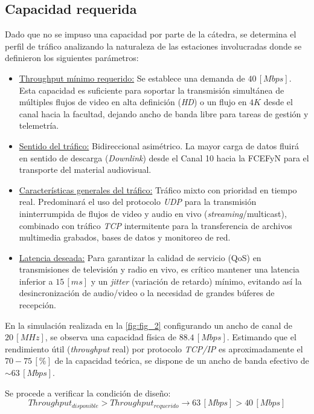 \subsection{Capacidad requerida}
\label{sec_2.9}
Dado que no se impuso una capacidad por parte de la cátedra, se determina el perfil de tráfico analizando la naturaleza de las estaciones involucradas donde se definieron los siguientes parámetros:
\begin{itemize}
    \item \underline{Throughput mínimo requerido:} Se establece una demanda de $40 \, [Mbps]$. Esta capacidad es suficiente para soportar la transmisión simultánea de múltiples flujos de video en alta definición (\textit{HD}) o un flujo en $4K$ desde el canal hacia la facultad, dejando ancho de banda libre para tareas de gestión y telemetría.
    
    \item \underline{Sentido del tráfico:} Bidireccional asimétrico. La mayor carga de datos fluirá en sentido de descarga (\textit{Downlink}) desde el Canal 10 hacia la FCEFyN para el transporte del material audiovisual.
    
    \item \underline{Características generales del tráfico:} Tráfico mixto con prioridad en tiempo real. Predominará el uso del protocolo \textit{UDP} para la transmisión ininterrumpida de flujos de video y audio en vivo (\textit{streaming}/multicast), combinado con tráfico \textit{TCP} intermitente para la transferencia de archivos multimedia grabados, bases de datos y monitoreo de red.
    
    \item \underline{Latencia deseada:} Para garantizar la calidad de servicio (QoS) en transmisiones de televisión y radio en vivo, es crítico mantener una latencia inferior a $15 \, [ms]$ y un \textit{jitter} (variación de retardo) mínimo, evitando así la desincronización de audio/video o la necesidad de grandes búferes de recepción.
\end{itemize}

En la simulación realizada en la \autoref{fig:fig_2} configurando un ancho de canal de $20 \, [MHz]$, se observa una capacidad física de $88.4 \, [Mbps]$. Estimando que el rendimiento útil (\textit{throughput} real) por protocolo \textit{TCP/IP} es aproximadamente el $70 - 75 \, [\%]$ de la capacidad teórica, se dispone de un ancho de banda efectivo de $\sim 63 \, [Mbps]$.

Se procede a verificar la condición de diseño:
\begin{equation}
    Throughput_{disponible} > Throughput_{requerido} \longrightarrow 63 \, [Mbps] > 40 \, [Mbps]
    \label{eq_5}
\end{equation}

